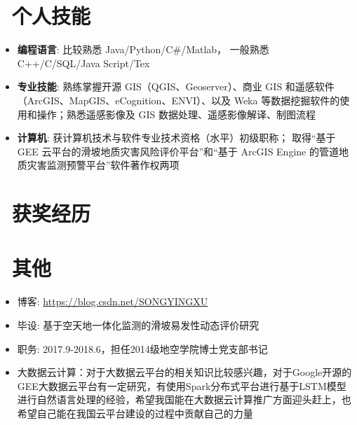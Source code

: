 \documentclass{resume}
\begin{document}
\section{\faCogs\ 个人技能}
\begin{itemize}[parsep=0.25ex]
  \item \textbf{编程语言}:
    比较熟悉 Java/Python/C\#/Matlab，
    一般熟悉 C++/C/SQL/Java Script/Tex
  
  \item \textbf{专业技能}:
  熟练掌握开源 GIS（QGIS、Geoserver）、商业 GIS 和遥感软件（ArcGIS、MapGIS、eCognition、ENVI）、以及 Weka 等数据挖掘软件的使用和操作；熟悉遥感影像及 GIS 数据处理、遥感影像解译、制图流程

  \item \textbf{计算机}:
  获计算机技术与软件专业技术资格（水平）初级职称；
  取得“基于 GEE 云平台的滑坡地质灾害风险评价平台”和“基于 ArcGIS Engine 的管道地质灾害监测预警平台”软件著作权两项

\end{itemize}

\section{\faHeartO\ 获奖经历}

\section{\faInfo\ 其他}
\begin{itemize}[parsep=0.25ex]
  \item 博客: \url{https://blog.csdn.net/SONGYINGXU} 
  \item 毕设: 基于空天地一体化监测的滑坡易发性动态评价研究
  \item 职务: 2017.9-2018.6，担任2014级地空学院博士党支部书记
  \item 大数据云计算：对于大数据云平台的相关知识比较感兴趣，对于Google开源的GEE大数据云平台有一定研究，有使用Spark分布式平台进行基于LSTM模型进行自然语言处理的经验，希望我国能在大数据云计算推广方面迎头赶上，也希望自己能在我国云平台建设的过程中贡献自己的力量
\end{itemize}

%
%
\end{document}
